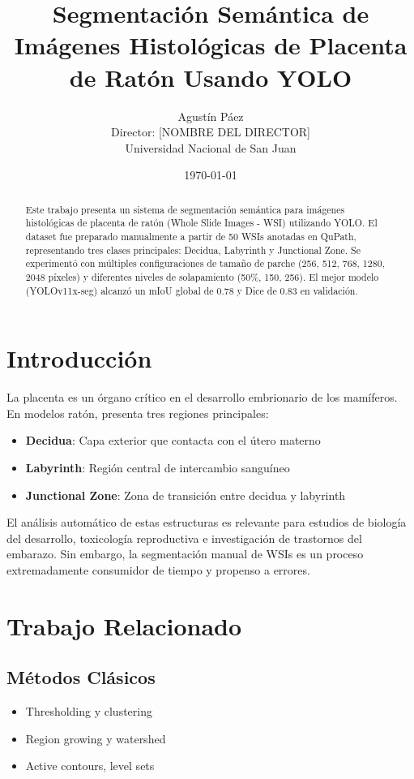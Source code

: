 \documentclass[12pt,a4paper]{article}
\title{Segmentación Semántica de Imágenes Histológicas de Placenta de Ratón Usando YOLO}
\author{Agustín Páez\\Director: [NOMBRE DEL DIRECTOR]\\Universidad Nacional de San Juan}
\date{\today}
\begin{document}
\maketitle

\begin{abstract}
Este trabajo presenta un sistema de segmentación semántica para imágenes histológicas de placenta de ratón (Whole Slide Images - WSI) utilizando YOLO. El dataset fue preparado manualmente a partir de 50 WSIs anotadas en QuPath, representando tres clases principales: Decidua, Labyrinth y Junctional Zone. Se experimentó con múltiples configuraciones de tamaño de parche (256, 512, 768, 1280, 2048 píxeles) y diferentes niveles de solapamiento (50\%, 150, 256). El mejor modelo (YOLOv11x-seg) alcanzó un mIoU global de 0.78 y Dice de 0.83 en validación.
\end{abstract}

\section{Introducción}

La placenta es un órgano crítico en el desarrollo embrionario de los mamíferos. En modelos ratón, presenta tres regiones principales:
\begin{itemize}
    \item \textbf{Decidua}: Capa exterior que contacta con el útero materno
    \item \textbf{Labyrinth}: Región central de intercambio sanguíneo
    \item \textbf{Junctional Zone}: Zona de transición entre decidua y labyrinth
\end{itemize}

El análisis automático de estas estructuras es relevante para estudios de biología del desarrollo, toxicología reproductiva e investigación de trastornos del embarazo. Sin embargo, la segmentación manual de WSIs es un proceso extremadamente consumidor de tiempo y propenso a errores.

\section{Trabajo Relacionado}

\subsection{Métodos Clásicos}
\begin{itemize}
    \item Thresholding y clustering
    \item Region growing y watershed
    \item Active contours, level sets
\end{itemize}
\end{document}
